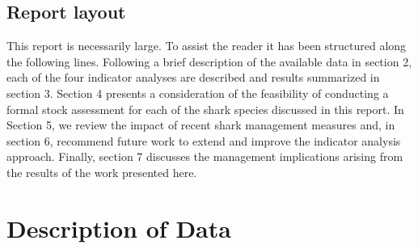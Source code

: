 \documentclass[12pt]{SCreport}
\begin{document}
\subsection{Report layout}
This report is necessarily large. To assist the reader it has been structured along the following lines. Following a brief description of the available data in section 2, each of the four indicator analyses are described and results summarized in section 3. Section 4 presents a consideration of the feasibility of conducting a formal stock assessment for each of the shark species discussed in this report.  In Section 5, we review the impact of recent shark management measures and, in section 6, recommend future work to extend and improve the indicator analysis approach.  Finally, section 7 discusses the management implications arising from the results of the work presented here.

\section{Description of Data}
\end{document}
